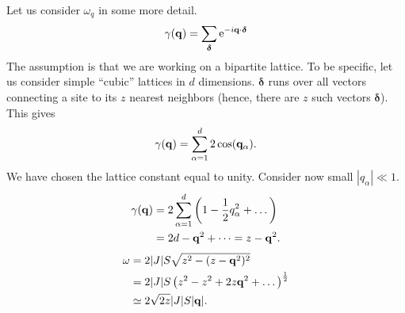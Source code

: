 Let us consider $\omega_q$ in some more detail.
\begin{equation}
	\gamma(\vb{q}) = \sum_{\bm{\delta}}\mathrm{e}^{-i\vb{q}\cdot\bm{\delta}}
\end{equation}
The assumption is that we are working on a bipartite lattice. To be specific, let us consider simple ``cubic'' lattices in $d$ dimensions. $\bm{\delta}$ runs over all vectors connecting a site to its $z$ nearest neighbors (hence, there are $z$ such vectors $\bm{\delta}$). This gives
\begin{equation}
	\gamma(\vb{q}) = \sum_{\alpha = 1}^{d}2\cos(\vb{q}_\alpha).
\end{equation}
We have chosen the lattice constant equal to unity. 
Consider now small $|q_\alpha|\ll1$.
\begin{align}
	\gamma(\vb{q}) &= 2\sum_{\alpha=1}^{d}\left (1-\frac{1}{2}q_{\alpha}^2 + \dots\right )\nonumber \\
	&= 2d- \vb{q}^2 + \dots = z-\vb{q}^2.
\end{align}
\begin{align}
	\omega &= 2|J|S\sqrt{z^2 -(z-\vb{q}^2)^2} \nonumber \\
	&= 2|J|S\left (z^2-z^2 + 2z\vb{q}^2 +\dots \right )^{\frac{1}{2}} \nonumber\\
	&\simeq 2\sqrt{2z}|J|S|\vb{q}|.
\end{align}


